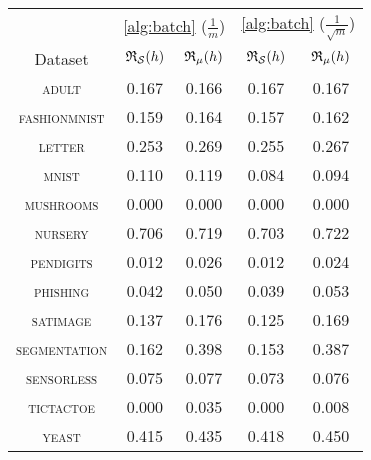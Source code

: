 \begin{tabular}{c|cc|cc}
\toprule
 & \multicolumn{2}{c}{\cref{alg:batch} {\small ($\frac{1}{m}$)}} & \multicolumn{2}{c}{\cref{alg:batch} {\small ($\frac{1}{\sqrt{m}}$)}} \\
Dataset & {\scriptsize $\mathfrak{R}_{\mathcal{S}}(h)$} & {\scriptsize $\mathfrak{R}_{\mu}(h)$} & {\scriptsize $\mathfrak{R}_{\mathcal{S}}(h)$} & {\scriptsize $\mathfrak{R}_{\mu}(h)$} \\
\midrule
\textsc{\footnotesize adult} & 0.167 & 0.166 & 0.167 & 0.167 \\
\textsc{\footnotesize fashionmnist} & 0.159 & 0.164 & 0.157 & 0.162 \\
\textsc{\footnotesize letter} & 0.253 & 0.269 & 0.255 & 0.267 \\
\textsc{\footnotesize mnist} & 0.110 & 0.119 & 0.084 & 0.094 \\
\textsc{\footnotesize mushrooms} & 0.000 & 0.000 & 0.000 & 0.000 \\
\textsc{\footnotesize nursery} & 0.706 & 0.719 & 0.703 & 0.722 \\
\textsc{\footnotesize pendigits} & 0.012 & 0.026 & 0.012 & 0.024 \\
\textsc{\footnotesize phishing} & 0.042 & 0.050 & 0.039 & 0.053 \\
\textsc{\footnotesize satimage} & 0.137 & 0.176 & 0.125 & 0.169 \\
\textsc{\footnotesize segmentation} & 0.162 & 0.398 & 0.153 & 0.387 \\
\textsc{\footnotesize sensorless} & 0.075 & 0.077 & 0.073 & 0.076 \\
\textsc{\footnotesize tictactoe} & 0.000 & 0.035 & 0.000 & 0.008 \\
\textsc{\footnotesize yeast} & 0.415 & 0.435 & 0.418 & 0.450 \\
\bottomrule
\end{tabular}

